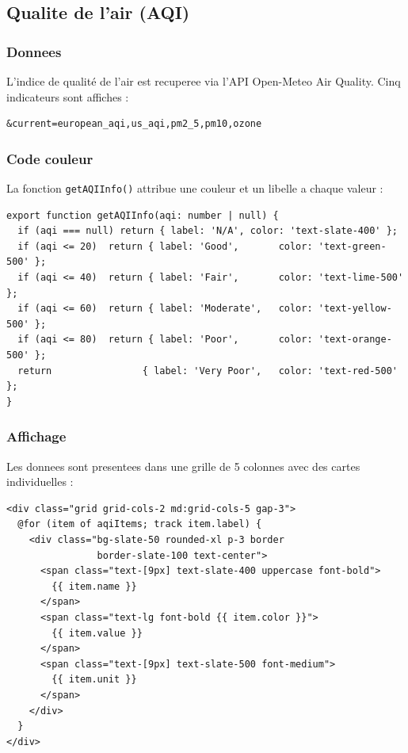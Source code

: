\documentclass[12pt,a4paper]{article}
\begin{document}
\newpage
\subsection{Qualite de l'air (AQI)}

\subsubsection{Donnees}

L'indice de qualité de l'air est recuperee via l'API Open-Meteo Air Quality. Cinq indicateurs sont affiches :

\begin{lstlisting}[style=angular, caption={Parametres AQI}]
&current=european_aqi,us_aqi,pm2_5,pm10,ozone
\end{lstlisting}

\subsubsection{Code couleur}

La fonction \texttt{getAQIInfo()} attribue une couleur et un libelle a chaque valeur :

\begin{lstlisting}[style=angular, caption={Fonction de code couleur AQI}]
export function getAQIInfo(aqi: number | null) {
  if (aqi === null) return { label: 'N/A', color: 'text-slate-400' };
  if (aqi <= 20)  return { label: 'Good',       color: 'text-green-500' };
  if (aqi <= 40)  return { label: 'Fair',       color: 'text-lime-500' };
  if (aqi <= 60)  return { label: 'Moderate',   color: 'text-yellow-500' };
  if (aqi <= 80)  return { label: 'Poor',       color: 'text-orange-500' };
  return                { label: 'Very Poor',   color: 'text-red-500' };
}
\end{lstlisting}

\subsubsection{Affichage}

Les donnees sont presentees dans une grille de 5 colonnes avec des cartes individuelles :

\begin{lstlisting}[style=angular, caption={Template de la grille AQI}]
<div class="grid grid-cols-2 md:grid-cols-5 gap-3">
  @for (item of aqiItems; track item.label) {
    <div class="bg-slate-50 rounded-xl p-3 border
                border-slate-100 text-center">
      <span class="text-[9px] text-slate-400 uppercase font-bold">
        {{ item.name }}
      </span>
      <span class="text-lg font-bold {{ item.color }}">
        {{ item.value }}
      </span>
      <span class="text-[9px] text-slate-500 font-medium">
        {{ item.unit }}
      </span>
    </div>
  }
</div>
\end{lstlisting}
\end{document}
